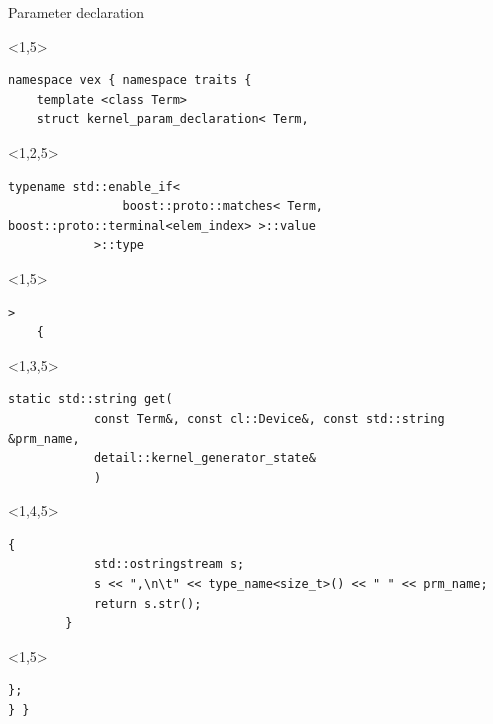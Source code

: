 \documentclass[@BEAMER_OPTIONS@]{beamer}
\begin{document}
\begin{frame}[fragile]{Parameter declaration}
    \begin{exampleblock}{}
        \begin{uncoverenv}<1,5>
            \begin{lstlisting}
namespace vex { namespace traits {
    template <class Term>
    struct kernel_param_declaration< Term,
            \end{lstlisting}
        \end{uncoverenv}
        \begin{uncoverenv}<1,2,5>
            \begin{lstlisting}[firstnumber=last]
            typename std::enable_if<
                boost::proto::matches< Term, boost::proto::terminal<elem_index> >::value
            >::type
            \end{lstlisting}
        \end{uncoverenv}
        \begin{uncoverenv}<1,5>
            \begin{lstlisting}[firstnumber=last]
        >
    {
            \end{lstlisting}
        \end{uncoverenv}
        \begin{uncoverenv}<1,3,5>
            \begin{lstlisting}[firstnumber=last]
        static std::string get(
            const Term&, const cl::Device&, const std::string &prm_name,
            detail::kernel_generator_state&
            )
            \end{lstlisting}
        \end{uncoverenv}
        \begin{uncoverenv}<1,4,5>
            \begin{lstlisting}[firstnumber=last]
        {
            std::ostringstream s;
            s << ",\n\t" << type_name<size_t>() << " " << prm_name;
            return s.str();
        }
            \end{lstlisting}
        \end{uncoverenv}
        \begin{uncoverenv}<1,5>
            \begin{lstlisting}[firstnumber=last]
    };
} }
            \end{lstlisting}
        \end{uncoverenv}
    \end{exampleblock}
\end{frame}
\end{document}
